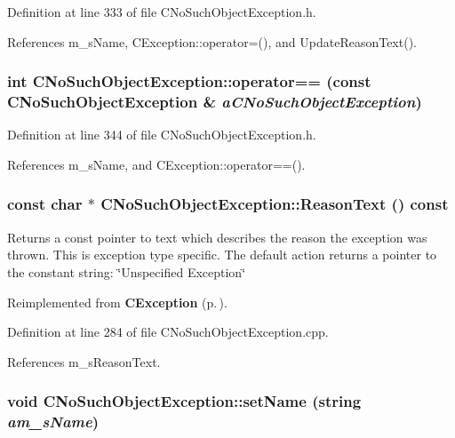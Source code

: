 Definition at line 333 of file CNo\-Such\-Object\-Exception.h.

References m\_\-s\-Name, CException::operator=(), and Update\-Reason\-Text().
\subsubsection{\setlength{\rightskip}{0pt plus 5cm}int CNo\-Such\-Object\-Exception::operator== (const CNo\-Such\-Object\-Exception \& {\em a\-CNo\-Such\-Object\-Exception})\hspace{0.3cm}{\tt  [inline]}}\label{classCNoSuchObjectException_a7}




Definition at line 344 of file CNo\-Such\-Object\-Exception.h.

References m\_\-s\-Name, and CException::operator==().
\subsubsection{\setlength{\rightskip}{0pt plus 5cm}const char $\ast$ CNo\-Such\-Object\-Exception::Reason\-Text () const\hspace{0.3cm}{\tt  [virtual]}}\label{classCNoSuchObjectException_a10}


Returns a const pointer to text which describes the reason the exception was thrown. This is exception type specific. The default action returns a pointer to the constant string: \char`\"{}Unspecified Exception\char`\"{} 

Reimplemented from {\bf CException} {\rm (p.\,\pageref{classCException_a8})}.

Definition at line 284 of file CNo\-Such\-Object\-Exception.cpp.

References m\_\-s\-Reason\-Text.
\subsubsection{\setlength{\rightskip}{0pt plus 5cm}void CNo\-Such\-Object\-Exception::set\-Name (string {\em am\_\-s\-Name})\hspace{0.3cm}{\tt  [inline]}}\label{classCNoSuchObjectException_a9}





